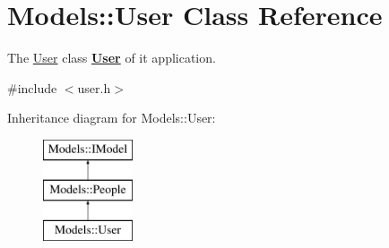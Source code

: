 \hypertarget{classModels_1_1User}{\section{Models\-:\-:User Class Reference}
\label{classModels_1_1User}
}


The \hyperlink{classModels_1_1User}{User} class {\bfseries \hyperlink{classModels_1_1User}{User}} of it application.  




{\ttfamily \#include $<$user.\-h$>$}

Inheritance diagram for Models\-:\-:User\-:\begin{figure}[H]
\begin{center}
\leavevmode
\includegraphics[height=3.000000cm]{df/d68/classModels_1_1User}
\end{center}
\end{figure}
